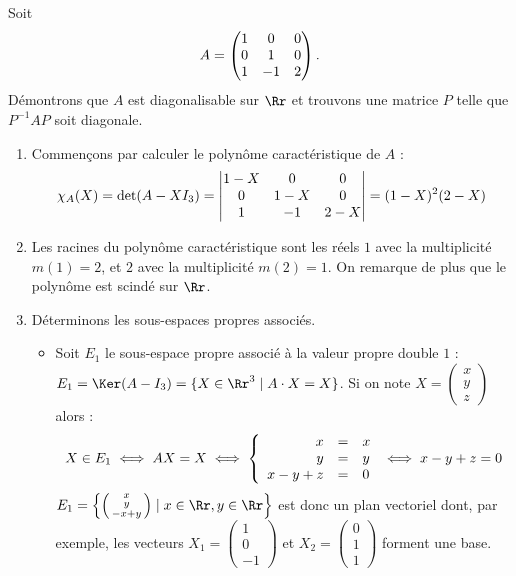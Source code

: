 \documentclass[12pt, class=report,crop=false]{standalone}
\begin{document}
\begin{exemple}
Soit $$A=\left(\begin{matrix}1&0&0\cr0&1&0\cr1&-1&2\end{matrix}\right).$$
Démontrons que $A$ est diagonalisable sur $\Rr$ et trouvons une matrice $P$ telle que $P^{-1}AP$ soit diagonale.


\begin{enumerate}
  \item Commençons par calculer le polynôme caractéristique de $A$ :
$$\chi_A(X)
= \det(A-XI_3) 
= \begin{vmatrix}1-X&0&0\cr 0&1-X&0\cr1&-1&2-X\end{vmatrix}
=(1-X)^2(2-X)$$
  
  \item Les racines du polynôme caractéristique sont les réels $1$ avec la multiplicité $m(1)=2$, et $2$ avec la multiplicité $m(2)=1$. On remarque de plus que le polynôme est scindé sur $\Rr$.

  
  \item Déterminons les sous-espaces propres associés.
  \begin{itemize}
    \item Soit $E_1$ le sous-espace propre associé à la valeur propre double $1$ : $E_1 = \Ker(A-I_3) = \{X \in \Rr^3 \mid A \cdot X=X\}$.
Si on note $X = \left(\begin{smallmatrix}x\\y\\z\end{smallmatrix}\right)$ alors :
$$X\in E_1\iff AX=X \iff \left\{\begin{array}{rcl}
x&=&x\cr 
y&=&y\cr 
x-y+z&=&0
\end{array}\right.\iff x-y+z = 0$$
$E_1 = \left\lbrace\left(\begin{smallmatrix}x\\y\\-x+y\end{smallmatrix}\right) \mid x \in \Rr, y\in \Rr\right\rbrace$ est donc un plan vectoriel dont, par exemple, les vecteurs 
$X_1=\left(\begin{smallmatrix}1\\0\\-1\end{smallmatrix}\right)$ et 
$X_2=\left(\begin{smallmatrix}0\\1\\1\end{smallmatrix}\right)$ forment une base.


\end{itemize}
\end{enumerate}
\end{exemple}
\end{document}
